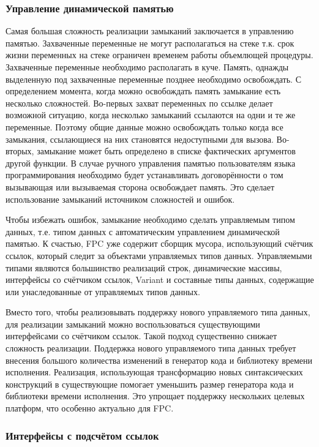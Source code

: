 \documentclass{imcs}
\begin{document}
\subsubsection{Управление динамической памятью}

Самая большая сложность реализации замыканий заключается в управлению памятью. Захваченные переменные
не могут располагаться на стеке т.к. срок жизни переменных на стеке ограничен временем
работы объемлющей процедуры. Захваченные переменные необходимо располагать в куче. Память, однажды
выделенную под захваченные переменные позднее необходимо освобождать. С определением момента,
когда можно освобождать память замыкание есть несколько сложностей. Во-первых 
захват переменных по ссылке делает возможной ситуацию, когда несколько замыканий ссылаются 
на одни и те же переменные. Поэтому общие данные можно освобождать только когда все замыкания,
ссылающиеся на них становятся недоступными для вызова. Во-вторых, замыкание
может быть определено в списке фактических аргументов другой функции. В случае ручного управления 
памятью пользователям языка программирования необходимо будет устанавливать договорённости
о том вызывающая или вызываемая сторона освобождает память. Это сделает использование замыканий
источником сложностей и ошибок.

Чтобы избежать ошибок, замыкание необходимо сделать управляемым типом данных, т.е.
типом данных с автоматическим управлением динамической памятью. К счастью, FPC уже содержит
сборщик мусора, использующий счётчик ссылок, который следит за объектами управляемых
типов данных. Управляемыми типами являются 
большинство реализаций строк, динамические массивы, интерфейсы со счётчиком ссылок, Variant и
составные типы данных, содержащие или унаследованные от управляемых типов данных.

Вместо того, чтобы реализовывать поддержку нового управляемого типа данных, для реализации
замыканий можно воспользоваться существующими интерфейсами со счётчиком ссылок. Такой подход существенно
снижает сложность реализации. Поддержка нового управляемого типа данных требует внесения большого количества
изменений в генератор кода и библиотеку времени исполнения. Реализация, использующая трансформацию
новых синтаксических конструкций в существующие помогает уменьшить размер генератора кода и библиотеки времени
исполнения. Это упрощает поддержку нескольких целевых платформ, что особенно актуально для FPC.

\subsubsection{Интерфейсы с подсчётом ссылок}
\end{document}
